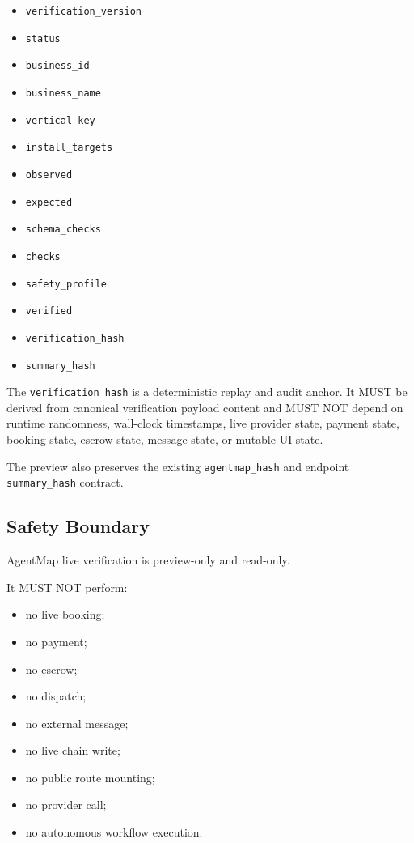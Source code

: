 \documentclass[11pt]{article}
\begin{document}
\begin{itemize}[leftmargin=*]
  \item \texttt{verification\_version}
  \item \texttt{status}
  \item \texttt{business\_id}
  \item \texttt{business\_name}
  \item \texttt{vertical\_key}
  \item \texttt{install\_targets}
  \item \texttt{observed}
  \item \texttt{expected}
  \item \texttt{schema\_checks}
  \item \texttt{checks}
  \item \texttt{safety\_profile}
  \item \texttt{verified}
  \item \texttt{verification\_hash}
  \item \texttt{summary\_hash}
\end{itemize}

The \texttt{verification\_hash} is a deterministic replay and audit anchor. It MUST be derived from canonical verification payload content and MUST NOT depend on runtime randomness, wall-clock timestamps, live provider state, payment state, booking state, escrow state, message state, or mutable UI state.

The preview also preserves the existing \texttt{agentmap\_hash} and endpoint \texttt{summary\_hash} contract.

\subsection{Safety Boundary}

AgentMap live verification is preview-only and read-only.

It MUST NOT perform:

\begin{itemize}[leftmargin=*]
  \item no live booking;
  \item no payment;
  \item no escrow;
  \item no dispatch;
  \item no external message;
  \item no live chain write;
  \item no public route mounting;
  \item no provider call;
  \item no autonomous workflow execution.
\end{itemize}
\end{document}
